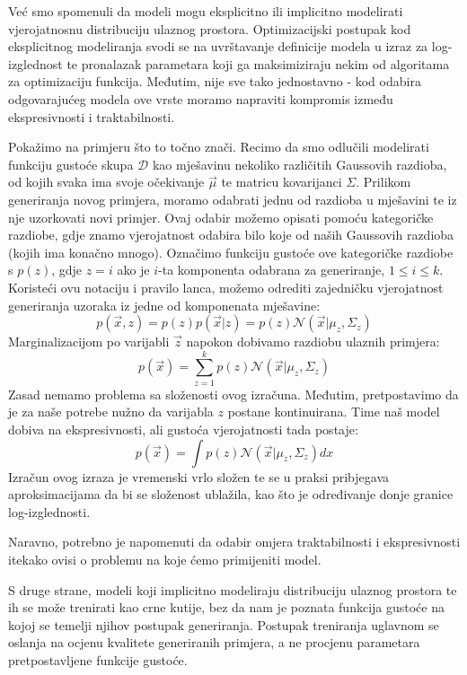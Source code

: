 Već smo spomenuli da modeli mogu eksplicitno ili implicitno modelirati vjerojatnosnu distribuciju ulaznog prostora. Optimizacijski postupak kod eksplicitnog modeliranja svodi se na uvrštavanje definicije modela u izraz za log-izglednost te pronalazak parametara koji ga maksimiziraju nekim od algoritama za optimizaciju funkcija. Međutim, nije sve tako jednostavno - kod odabira odgovarajućeg modela ove vrste moramo napraviti kompromis između ekspresivnosti i traktabilnosti. 

Pokažimo na primjeru što to točno znači. Recimo da smo odlučili modelirati funkciju gustoće skupa $\mathcal{D}$ kao mješavinu nekoliko različitih Gaussovih razdioba, od kojih svaka ima svoje očekivanje $\vec{\mu}$ te matricu kovarijanci $\Sigma$. Prilikom generiranja novog primjera, moramo odabrati jednu od razdioba u mješavini te iz nje uzorkovati novi primjer. Ovaj odabir možemo opisati pomoću kategoričke razdiobe, gdje znamo vjerojatnost odabira bilo koje od naših Gaussovih razdioba (kojih ima konačno mnogo). Označimo funkciju gustoće ove kategoričke razdiobe s $p(z)$, gdje $z = i$ ako je $i$-ta komponenta odabrana za generiranje, $1 \leq i \leq k$. Koristeći ovu notaciju i pravilo lanca, možemo odrediti zajedničku vjerojatnost generiranja uzoraka iz jedne od komponenata mješavine:
\begin{equation*}
	p(\vec{x}, z) = p(z)p(\vec{x}|z) = p(z) \mathcal{N}(\vec{x}|\mu_z, \Sigma_z)
\end{equation*}
Marginalizacijom po varijabli $\vec{z}$ napokon dobivamo razdiobu ulaznih primjera:
\begin{equation*}
	p(\vec{x}) = \sum_{z=1}^k p(z)\mathcal{N}(\vec{x}|\mu_z, \Sigma_z)
\end{equation*}
Zasad nemamo problema sa složenosti ovog izračuna. Međutim, pretpostavimo da je za naše potrebe nužno da varijabla $z$ postane kontinuirana. Time naš model dobiva na ekspresivnosti, ali gustoća vjerojatnosti tada postaje:
\begin{equation*}
	p(\vec{x}) = \int p(z)\mathcal{N}(\vec{x}|\mu_z, \Sigma_z)dx
\end{equation*}
Izračun ovog izraza je vremenski vrlo složen te se u praksi pribjegava aproksimacijama da bi se složenost ublažila, kao što je određivanje donje granice log-izglednosti. 

Naravno, potrebno je napomenuti da odabir omjera traktabilnosti i ekspresivnosti itekako ovisi o problemu na koje ćemo primijeniti model.

S druge strane, modeli koji implicitno modeliraju distribuciju ulaznog prostora te ih se može trenirati kao crne kutije, bez da nam je poznata funkcija gustoće na kojoj se temelji njihov postupak generiranja. Postupak treniranja uglavnom se oslanja na ocjenu kvalitete generiranih primjera, a ne procjenu parametara pretpostavljene funkcije gustoće.





